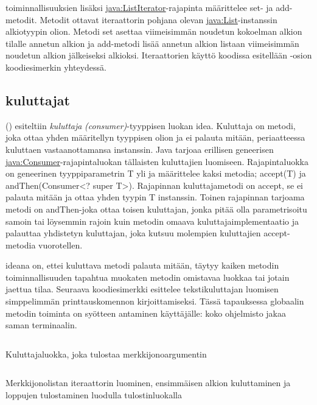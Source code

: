 \documentclass{tufte-book}
\newcommand{\eng}[1]{\textit{(#1)}}
\newcommand{\new}[1]{\textit{\gls{#1}}}
\newcommand{\neweng}[2]{\new{#1} \eng{#2}}
\newcommand{\java}[1]{\underline{\gls{java:#1}}}
\newcommand{\code}[3]{
\begin{listing}
    \inputminted{java}{OhjelmointiopasEsimerkit/src/#1/#2.java}
    \caption{#3}
    \label{Java-#1-#2}
\end{listing}
}
\begin{document}
 toiminnallisuuksien lisäksi \java{ListIterator}-rajapinta
määrittelee set- ja add-metodit. Metodit ottavat iteraattorin pohjana olevan 
\java{List}-instanssin alkiotyypin olion. Metodi set asettaa viimeisimmän noudetun kokoelman
alkion tilalle annetun alkion ja add-metodi lisää annetun alkion listaan viimeisimmän noudetun
alkion jälkeiseksi alkioksi. Iteraattorien käyttö koodissa esitellään -osion
koodiesimerkin yhteydessä.

\subsection{kuluttajat}
\label{consumers}

 () esiteltiin
\neweng{kuluttaja}{consumer}-tyyppisen luokan idea. Kuluttaja on metodi, joka ottaa yhden
määritellyn tyyppisen olion ja ei palauta mitään, periaatteessa kuluttaen vastaanottamansa
instanssin. Java tarjoaa erillisen geneerisen \java{Consumer}-rajapintaluokan tällaisten
kuluttajien luomiseen. Rajapintaluokka on geneerinen tyyppiparametrin T yli ja määrittelee kaksi
metodia; accept(T) ja andThen(Consumer<? super T>). Rajapinnan kuluttajametodi on accept, se ei
palauta mitään ja ottaa yhden tyypin T instanssin. Toinen rajapinnan tarjoama metodi on
andThen-joka ottaa toisen kuluttajan, jonka pitää olla parametrisoitu samoin tai löysemmin rajoin
kuin metodin omaava kuluttajaimplementaatio ja palauttaa yhdistetyn kuluttajan, joka kutsuu
molempien kuluttajien accept-metodia vuorotellen.

 ideana on, ettei kuluttava metodi palauta
mitään, täytyy kaiken metodin toiminnallisuuden tapahtua muokaten metodin omistavaa luokkaa tai
jotain jaettua tilaa. Seuraava koodiesimerkki esittelee tekstikuluttajan luomisen simppelimmän
printtauskomennon kirjoittamiseksi. Tässä tapauksessa globaalin metodin toiminta on syötteen
antaminen käyttäjälle: koko ohjelmisto jakaa saman terminaalin.

\code{week10/iteratorexample}{Printer}{Kuluttajaluokka, joka tulostaa merkkijonoargumentin}
\code{week10/iteratorexample}{IteratorExample}{Merkkijonolistan iteraattorin luominen, ensimmäisen
alkion kuluttaminen ja loppujen tulostaminen luodulla tulostinluokalla}

\end{document}
